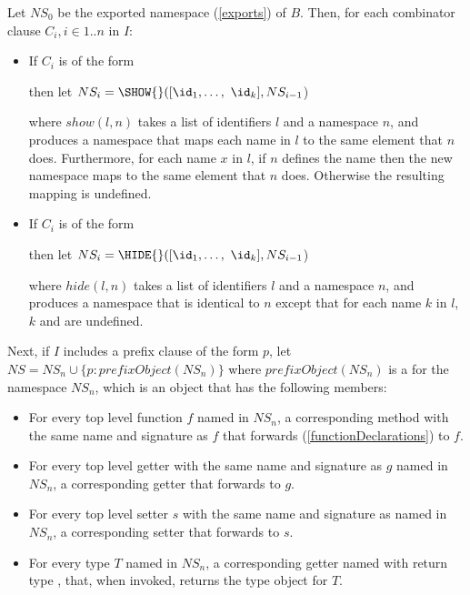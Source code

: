 \documentclass[makeidx]{article}
\begin{document}
{\LMHash{}%
Let $NS_0$ be the exported namespace (\ref{exports}) of $B$.
Then, for each combinator clause $C_i, i \in 1 .. n$ in $I$:
\begin{itemize}
\item If $C_i$ is of the form


then let $NS_i = \SHOW{}([\id_1, \ldots,\ \id_k], NS_{i-1}$)

where $show(l,n)$ takes a list of identifiers $l$ and a namespace $n$, and produces a namespace that maps each name in $l$ to the same element that $n$ does.
Furthermore, for each name $x$ in $l$, if $n$ defines the name  then the new namespace maps  to the same element that $n$ does.
Otherwise the resulting mapping is undefined.

\item If $C_i$ is of the form


then let $NS_i = \HIDE{}([\id_1, \ldots,\ \id_k], NS_{i-1}$)

where $hide(l, n)$ takes a list of identifiers $l$ and a namespace $n$, and produces a namespace that is identical to $n$ except that for each name $k$ in $l$, $k$ and  are undefined.
\end{itemize}

\LMHash{}%
Next, if $I$ includes a prefix clause of the form \AS{} $p$, let $NS = NS_n \cup \{p: prefixObject(NS_n)\}$ where $prefixObject(NS_n)$ is a  for the namespace $NS_n$, which is an object that has the following members:

\begin{itemize}
\item For every top level function $f$ named \id{} in $NS_n$, a corresponding method with the same name and signature as $f$ that forwards (\ref{functionDeclarations}) to $f$.
\item For every top level getter with the same name and signature as $g$ named \id{} in $NS_n$, a corresponding getter that forwards to $g$.
\item For every top level setter $s$ with the same name and signature as named \id{} in $NS_n$, a corresponding setter that forwards to $s$.
\item For every type $T$ named \id{} in $NS_n$, a corresponding getter named \id{} with return type , that, when invoked, returns the type object for $T$.
\end{itemize}

}
\end{document}
